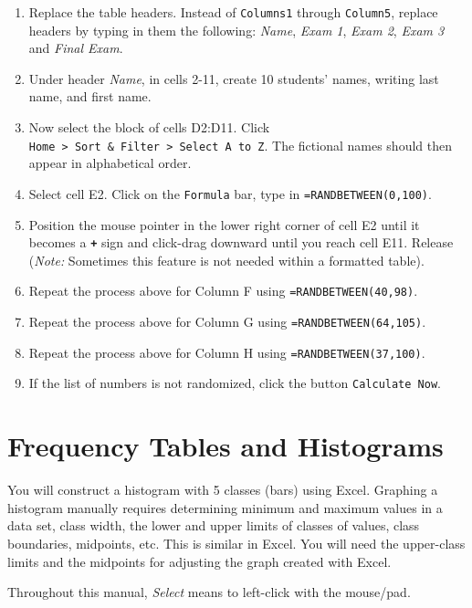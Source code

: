 \documentclass[
]{book}
\providecommand{\tightlist}{%
  \setlength{\itemsep}{0pt}\setlength{\parskip}{0pt}}
\begin{document}
\begin{enumerate}
\def\labelenumi{\arabic{enumi}.}
\setcounter{enumi}{3}
\tightlist
\item
  Replace the table headers. Instead of \texttt{Columns1} through \texttt{Column5}, replace headers by typing in them the following: \emph{Name}, \emph{Exam 1}, \emph{Exam 2}, \emph{Exam 3} and \emph{Final Exam}.
\item
  Under header \emph{Name}, in cells 2-11, create 10 students' names, writing last name, and first name.
\item
  Now select the block of cells D2:D11. Click \texttt{Home\ \textgreater{}\ Sort\ \&\ Filter\ \textgreater{}\ Select\ A\ to\ Z}. The fictional names should then appear in alphabetical order.
\item
  Select cell E2. Click on the \texttt{Formula} bar, type in \texttt{=RANDBETWEEN(0,100)}.
\item
  Position the mouse pointer in the lower right corner of cell E2 until it becomes a \textbf{\texttt{+}} sign and click-drag downward until you reach cell E11. Release (\emph{Note:} Sometimes this feature is not needed within a formatted table).
\item
  Repeat the process above for Column F using \texttt{=RANDBETWEEN(40,98)}.
\item
  Repeat the process above for Column G using \texttt{=RANDBETWEEN(64,105)}.
\item
  Repeat the process above for Column H using \texttt{=RANDBETWEEN(37,100)}.
\item
  If the list of numbers is not randomized, click the button \texttt{Calculate\ Now}.
\end{enumerate}

\hypertarget{frequency-tables-and-histograms}{%
\chapter{Frequency Tables and Histograms}\label{frequency-tables-and-histograms}}

You will construct a histogram with 5 classes (bars) using Excel.
Graphing a histogram manually requires determining minimum and maximum values in a data set, class width, the lower and upper limits of classes of values, class boundaries, midpoints, etc. This is similar in Excel. You will need the upper-class limits and the midpoints for adjusting the graph created with Excel.

Throughout this manual, \emph{Select} means to left-click with the mouse/pad.
\end{document}
